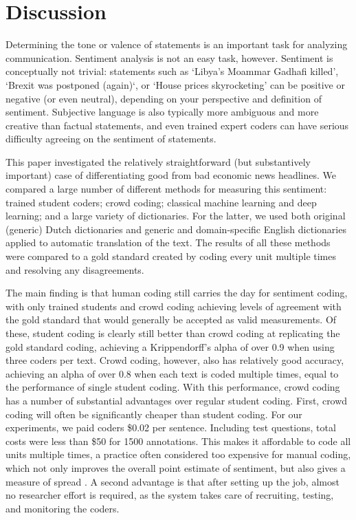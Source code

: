 \section{Discussion}

\noindent Determining the tone or valence of statements is an important task for analyzing communication.
Sentiment analysis is not an easy task, however.
Sentiment is conceptually not trivial: statements such as `Libya's Moammar Gadhafi killed', `Brexit was postponed (again)`, or
`House prices skyrocketing' can be positive or negative (or even neutral), depending on your perspective and definition of sentiment. 
Subjective language is also typically more ambiguous and more creative than factual statements,
and even trained expert coders can have serious difficulty agreeing on the sentiment of statements. 

This paper investigated the relatively straightforward (but substantively important) case of differentiating good from bad economic news headlines. %
We compared a large number of different methods for measuring this sentiment: 
trained student coders; crowd coding; classical machine learning and deep learning; and a large variety of dictionaries. 
For the latter, we used both original (generic) Dutch dictionaries and generic and domain-specific English dictionaries applied to automatic translation of the text.
The results of all these methods were compared to a gold standard created by coding every unit multiple times and 
resolving any disagreements. 

The main finding is that human coding still carries the day for sentiment coding, 
with only trained students and crowd coding achieving levels of agreement with the gold standard that would generally be accepted as valid measurements. 
Of these, student coding is clearly still better than crowd coding at replicating the gold standard coding,
achieving a Krippendorff's alpha of over 0.9 when using three coders per text.
Crowd coding, however, also has relatively good accuracy, achieving an alpha of over 0.8 when each text is coded multiple times,
equal to the performance of single student coding.
With this performance, crowd coding has a number of substantial advantages over regular student coding. 
First, crowd coding will often be significantly cheaper than student coding. 
For our experiments, we paid coders \$0.02 per sentence. Including test questions, total costs were less than \$50 for 1500 annotations.
This makes it affordable to code all units multiple times, a practice often considered too expensive for manual coding, 
which not only improves the overall point estimate of sentiment, but also gives a measure of spread \citep[cf.][]{benoit16,lind2017content}.
A second advantage is that after setting up the job, almost no researcher effort is required,
as the system takes care of recruiting, testing, and monitoring the coders. 

